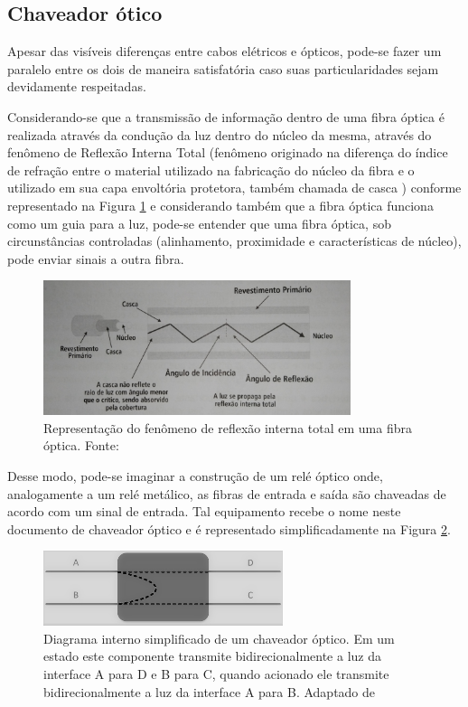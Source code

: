 \documentclass[12pt]{article}
\begin{document}
\subsection{Chaveador ótico}
Apesar das visíveis diferenças entre cabos elétricos e ópticos, pode-se fazer um paralelo entre os dois de maneira satisfatória caso suas particularidades sejam devidamente respeitadas. 

Considerando-se que a transmissão de informação dentro de uma fibra óptica é realizada através da condução da luz dentro do núcleo da mesma, através do fenômeno de Reflexão Interna Total (fenômeno originado na diferença do índice de refração entre o material utilizado
na fabricação do núcleo da fibra e o utilizado em sua capa envoltória protetora, também chamada de casca \cite{inbook_data_cabling}) conforme representado na Figura \ref{fig_fibra_optica} e considerando  também que a fibra óptica funciona como um guia para a luz, pode-se entender que uma fibra óptica, sob circunstâncias controladas (alinhamento, proximidade e características de núcleo), pode enviar sinais a outra fibra. 

\begin{figure}[ht] %
	\centering
	\includegraphics[width=9cm]{fibra_optica}
	\caption{Representação do fenômeno de reflexão interna total em uma fibra óptica. Fonte: \cite{inbook_data_cabling}}
	\label{fig_fibra_optica}
\end{figure}

Desse modo, pode-se imaginar a construção de um relé óptico onde, analogamente a um relé metálico, as fibras de entrada e saída são chaveadas de acordo com um sinal de entrada. Tal equipamento recebe o nome neste documento de chaveador óptico e é representado simplificadamente na Figura \ref{fig_switch_optico}. 

\begin{figure}[ht] %
	\centering
	\includegraphics[width=7cm]{Switch_optico}
	\caption{Diagrama interno simplificado de um chaveador óptico. Em um estado este componente transmite bidirecionalmente a luz da interface A para D e B para C, quando acionado ele transmite bidirecionalmente a luz da interface A para B. Adaptado de \cite{Accelink2014}}
	\label{fig_switch_optico}
\end{figure}
\end{document}
